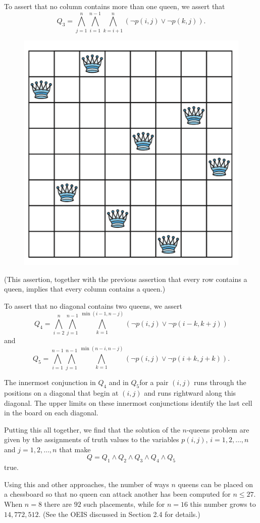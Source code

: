 \documentclass{Axon}
\begin{document}
\begin{example}
    To assert that no column contains more than one queen, we assert that
    \begin{equation*}
        Q_3 = \bigwedge_{j = 1}^n \bigwedge_{i = 1}^{n - 1} \bigwedge_{k = i + 1}^n (\lnot p(i, j) \lor \lnot p(k, j)).
    \end{equation*}
    
    \begin{figure}[ht]
        \centering
        \includegraphics[width=0.25\linewidth]{Discrete Mathematics and its Applications, 8th Edition/Chapter 1 Logic and Proofs/Section 1.3 Propositional Equivalences/Figure 1.png}
        \caption{}
        \label{Figure: 1}
    \end{figure}
    
    (This assertion, together with the previous assertion that every row contains a queen, implies that every column contains a queen.)
    
    To assert that no diagonal contains two queens, we assert
    \begin{equation*}
        Q_4 = \bigwedge_{i = 2}^n \bigwedge_{j = 1}^{n - 1} \bigwedge_{k = 1}^{\min(i - 1, n - j)} (\lnot p(i, j) \lor \lnot p(i - k, k + j))
    \end{equation*}
    and
    \begin{equation*}
        Q_5 = \bigwedge_{i = 1}^{n - 1} \bigwedge_{j = 1}^{n - 1} \bigwedge_{k = 1}^{\min(n - i, n - j)} (\lnot p(i, j) \lor \lnot p(i + k, j + k)).
    \end{equation*}
    
    The innermost conjunction in \(Q_4\) and in \(Q_5\)for a pair \((i, j)\) runs through the positions on a diagonal that begin at \((i, j)\) and runs rightward along this diagonal. The upper limits on these innermost conjunctions identify the last cell in the board on each diagonal.
    
    Putting this all together, we find that the solution of the \(n\)-queens problem are given by the assignments of truth values to the variables \(p(i, j)\), \(i = 1, 2, \ldots, n\) and \(j = 1, 2, \ldots, n\) that make
    \begin{equation*}
        Q = Q_1 \land Q_2 \land Q_3 \land Q_4 \land Q_5
    \end{equation*}
    true.
    
    Using this and other approaches, the number of ways \(n\) queens can be placed on a chessboard so that no queen can attack another has been computed for \(n \leq 27\). When \(n = 8\) there are \(92\) such placements, while for \(n = 16\) this number grows to \(14,772,512\). (See the OEIS discussed in Section 2.4 for details.)
\end{example}
\end{document}
